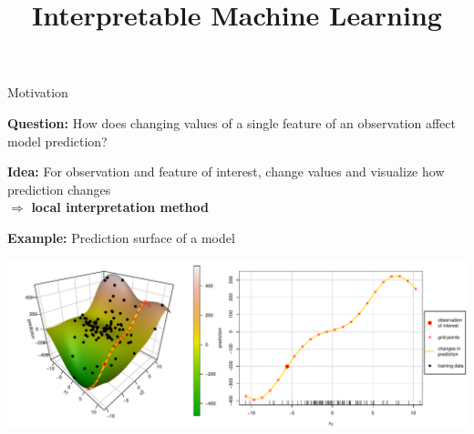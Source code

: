 \documentclass[11pt,compress,t,notes=noshow, aspectratio=169, xcolor=table]{beamer}
\title{Interpretable Machine Learning}
\date{}
\begin{document}
\newcommand{\titlefigure}{figure/feature-effect}
\newcommand{\learninggoals}{
\item Intro to feature effects
\item ICE plots
}



\begin{frame}{Motivation}

\textbf{Question:} How does changing values of a single feature of an observation affect model prediction?

\textbf{Idea:} For observation and feature of interest, change values and visualize how prediction changes\\
$\Rightarrow$ \textbf{local interpretation method}

\textbf{Example:} Prediction surface of a model

\includegraphics[width=\textwidth]{figure/ice_motivation}

\end{frame}
\end{document}
